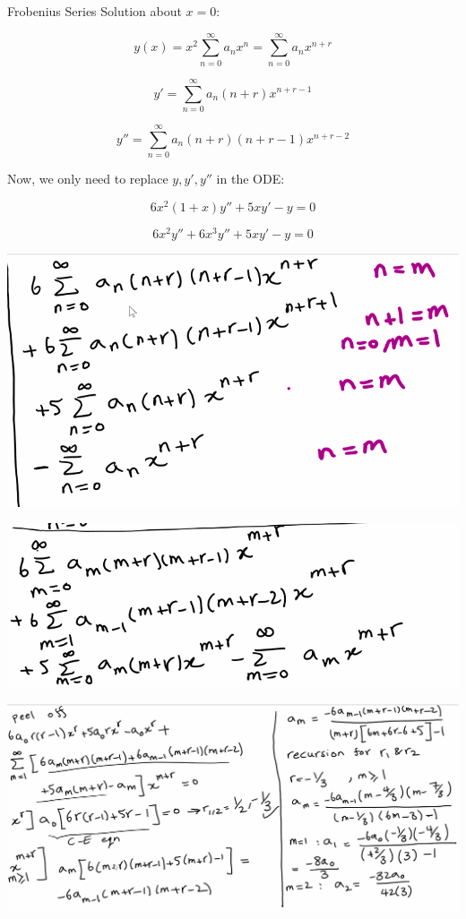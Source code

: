 \documentclass{article}
\begin{document}
\hfill \break 

Frobenius Series Solution about $x = 0$:

$$y(x) = x^2 \sum_{n = 0}^{\infty} a_n x^n = \sum_{n = 0}^{\infty} a_n x^{n+r}$$

$$y' = \sum_{n = 0}^{\infty} a_n (n+r) x^{n+r-1}$$

$$y'' = \sum_{n = 0}^{\infty} a_n (n+r)(n+r-1) x^{n+r-2}$$

Now, we only need to replace $y, y', y''$ in the ODE:

$$6x^2(1+x) y'' + 5xy' - y = 0$$

$$6x^2 y'' + 6x^3 y'' + 5xy' - y = 0$$

\includegraphics[width = 0.95 \textwidth]{image4.png}

\includegraphics[width = 0.95 \textwidth]{image5.png}

\includegraphics[width = 0.95 \textwidth]{image6.png}
\end{document}
